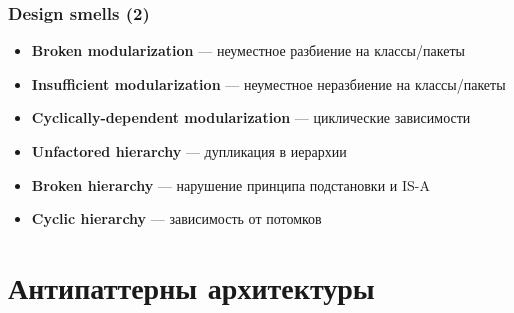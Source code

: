 \documentclass[xetex,mathserif,serif]{beamer}
\begin{document}
	\begin{frame}
		\frametitle{Design smells (2)}
		\begin{itemize}
			\item \textbf{Broken modularization} --- неуместное разбиение на классы/пакеты
			\item \textbf{Insufficient modularization} --- неуместное неразбиение на классы/пакеты
			\item \textbf{Cyclically-dependent modularization} --- циклические зависимости
			\item \textbf{Unfactored hierarchy} --- дупликация в иерархии
			\item \textbf{Broken hierarchy} --- нарушение принципа подстановки и IS-A
			\item \textbf{Cyclic hierarchy} --- зависимость от потомков
		\end{itemize}
	\end{frame}

	\section{Антипаттерны архитектуры}
\end{document}
